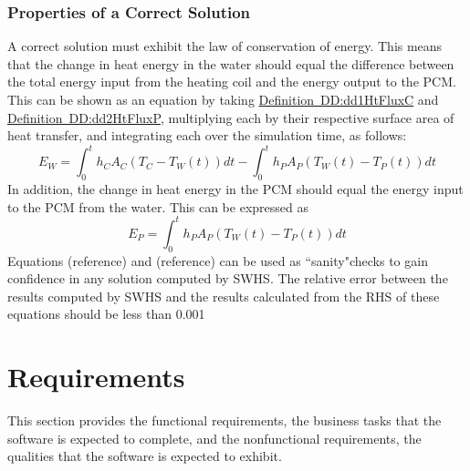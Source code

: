\documentclass[12pt]{article}
\begin{document}
\subsubsection{Properties of a Correct Solution}
\label{Sec:PoaCS}
A correct solution must exhibit the law of conservation of energy. This means that the change in heat energy in the water should equal the difference between  the total energy input from the heating coil and the energy output to the PCM. This can be shown as an equation by taking \hyperref[DD:dd1HtFluxC]{Definition~DD:dd1HtFluxC} and \hyperref[DD:dd2HtFluxP]{Definition~DD:dd2HtFluxP}, multiplying each by their respective surface area of heat transfer, and integrating each over the simulation time, as follows:
\begin{equation}
E_{W}=\int_{0}^{t}{h_{C}A_{C}(T_{C}-T_{W}(t))dt}-\int_{0}^{t}{h_{P}A_{P}(T_{W}(t)-T_{P}(t))dt}
\end{equation}
In addition, the change in heat energy in the PCM should equal the energy input to the PCM from the water. This can be expressed as
\begin{equation}
E_{P}=\int_{0}^{t}{h_{P}A_{P}(T_{W}(t)-T_{P}(t))dt}
\end{equation}
Equations (reference) and (reference) can be used as ``sanity"checks to gain confidence in any solution computed by SWHS. The relative error between the results computed by SWHS and the results calculated from the RHS of these equations should be less than 0.001%
\section{Requirements}
\label{Sec:Rs}
This section provides the functional requirements, the business tasks that the software is expected to complete, and the nonfunctional requirements, the qualities that the software is expected to exhibit.
\end{document}
